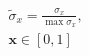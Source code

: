 \documentclass{article}
\begin{document}
\begin{gather}
    \tilde{\sigma}_{x} = \frac{\sigma_{x}}{\max \sigma_{x}},\\
    \boldsymbol{x} \in [0,1]
\end{gather}


















\end{document}
